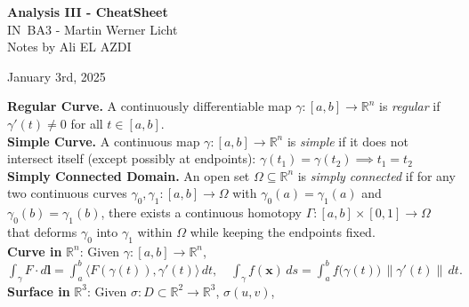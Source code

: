 \documentclass[8pt]{article}
\begin{document}
\begin{titlepage}
	\centering
	\vspace*{1cm}
	{\Huge \textbf{Analysis III - CheatSheet}} \\
	\vspace{10px}
	{\LARGE IN~BA3 - Martin Werner Licht} \\
	\vspace*{1cm}
	{\Large Notes by Ali EL AZDI} \\
	\vfill
	\vspace*{100px}

	{\large January 3rd, 2025}
	\vspace*{20px}
\end{titlepage}

\newpage

\vspace*{-20px}
\noindent\textbf{Regular Curve.} A continuously differentiable map
$\gamma : [a,b] \to \mathbb{R}^n$
is \emph{regular} if $\gamma'(t) \neq 0$ for all $t \in [a,b]$. \\
\noindent\textbf{Simple Curve.}
A continuous map
$\gamma : [a,b] \to \mathbb{R}^n$
is \emph{simple} if it does not intersect itself (except possibly at endpoints):
$\gamma(t_1) = \gamma(t_2) \implies t_1 = t_2$ \\
\noindent\textbf{Simply Connected Domain.}
An open set $\Omega \subseteq \mathbb{R}^n$ is \emph{simply connected} if for any two continuous curves
$\gamma_0, \gamma_1 : [a,b] \to \Omega$
with $\gamma_0(a) = \gamma_1(a)$ and $\gamma_0(b) = \gamma_1(b)$,
there exists a continuous homotopy
$\Gamma : [a,b]\times[0,1] \to \Omega$
that deforms $\gamma_0$ into $\gamma_1$ within $\Omega$ while keeping the endpoints fixed.\\[-2pt]
\noindent\textbf{Curve in } $\mathbb{R}^n$: Given $\gamma : [a,b] \to \mathbb{R}^n$,$ \int_{\gamma} F \cdot d\mathbf{l} = \int_a^b \big\langle F(\gamma(t)), \gamma'(t)\big\rangle \, dt, \quad \int_{\gamma} f(\mathbf{x}) \, ds = \int_a^b f\big(\gamma(t)\big)\,\|\gamma'(t)\| \, dt.$  \vspace{-50px}
\\
\noindent\textbf{Surface in } $\mathbb{R}^3$:
Given $\sigma : D \subset \mathbb{R}^2 \to \mathbb{R}^3$, $\sigma(u,v)$,
\vspace{-10px}
\end{document}
